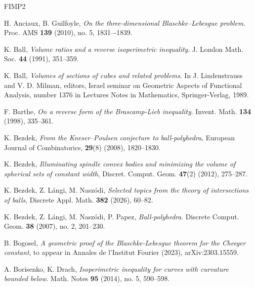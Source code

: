 \documentclass[11pt, oneside]{amsart}
\theoremstyle{theorem}
\theoremstyle{Intro}
\theoremstyle{definition}
\theoremstyle{remark}
\theoremstyle{claim}
\numberwithin{equation}{section}
\begin{document}
\begin{thebibliography}{FIMP2}


H. Anciaux, B. Guilfoyle, \emph{On the three-dimensional Blaschke--Lebesgue problem}. Proc. AMS \textbf{139} (2010), no. 5, 1831–-1839.


%



 K. Ball, \emph{Volume ratios and a reverse isoperimetric inequality}. J. London Math. Soc. \textbf{44} (1991), 351--359.

 K. Ball, \emph{Volumes of sections of cubes and related problems}. In J. Lindenstrauss and V. D. Milman, editors, Israel seminar on Geometric Aspects of Functional Analysis, number 1376 in Lectures Notes in Mathematics, Springer-Verlag, 1989.


%
 F. Barthe, \emph{On a reverse form of the Brascamp-Lieb inequality}. Invent. Math. \textbf{134} (1998), 335--361.

 K. Bezdek, \emph{From the Kneser–Poulsen conjecture to ball-polyhedra}, European Journal of Combinatorics, {\bf29}(8) (2008), 1820--1830.


K. Bezdek,  \emph{Illuminating spindle convex bodies and minimizing the volume of spherical sets of constant width}, Discret. Comput. Geom. \textbf{47}(2) (2012), 275--287.

K. Bezdek, Z. L\'angi, M. Nasz\'odi, \emph{Selected topics from the theory of intersections of balls}, Discrete Appl. Math. {\bf 382} (2026), 60--82.

K. Bezdek, Z. L\'angi, M. Nasz\'odi, P. Papez, \emph{Ball-polyhedra}. Discrete Comput. Geom. \textbf{38} (2007), no. 2, 201--230.

B. Bogosel, \emph{A geometric proof of the Blaschke-Lebesgue theorem for the Cheeger constant}, to appear 
in Annales de l'Institut Fourier (2023), 	arXiv:2303.15559.

 A. Borisenko, K. Drach, \emph{Isoperimetric inequality for curves with curvature bounded below}. Math. Notes \textbf{95} (2014), no. 5, 590--598.




\end{thebibliography}
\end{document}

